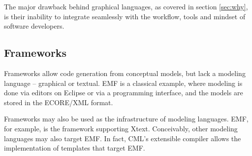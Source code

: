 The major drawback behind graphical languages,
as covered in section \ref{sec:why},
is their inability to integrate seamlessly with the workflow, tools and mindset of software developers.

\subsection{Frameworks}

Frameworks allow code generation from conceptual models, but lack a modeling language -- graphical or textual. EMF is a classical example, where modeling is done via editors on Eclipse or via a programming interface, and the models are stored in the ECORE/XML format. 

Frameworks may also be used as the infrastructure of modeling languages.
EMF, for example, is the framework supporting Xtext.
Conceivably, other modeling languages may also target EMF.
In fact, CML's extensible compiler allows the implementation of templates that target EMF.

